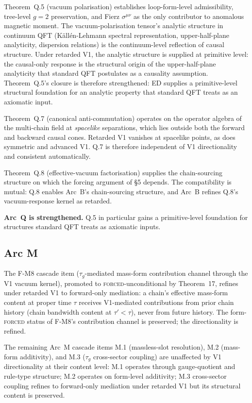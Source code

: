 \documentclass[11pt,a4paper]{article}
\begin{document}
Theorem~Q.5 (vacuum polarisation) establishes loop-form-level admissibility, tree-level $g=2$ preservation, and Fierz $\sigma^{\mu\nu}$ as the only contributor to anomalous magnetic moment. The vacuum-polarisation tensor's analytic structure in continuum QFT (K\"all\'en-Lehmann spectral representation, upper-half-plane analyticity, dispersion relations) is the continuum-level reflection of causal structure. Under retarded V1, the analytic structure is supplied at primitive level: the causal-only response is the structural origin of the upper-half-plane analyticity that standard QFT postulates as a causality assumption. Theorem~Q.5's closure is therefore strengthened: ED supplies a primitive-level structural foundation for an analytic property that standard QFT treats as an axiomatic input.

Theorem~Q.7 (canonical anti-commutation) operates on the operator algebra of the multi-chain field at \emph{spacelike} separations, which lies outside both the forward and backward causal cones. Retarded V1 vanishes at spacelike points, as does symmetric and advanced V1. Q.7 is therefore independent of V1 directionality and consistent automatically.

Theorem~Q.8 (effective-vacuum factorisation) supplies the chain-sourcing structure on which the forcing argument of \S5 depends. The compatibility is mutual: Q.8 enables Arc~B's chain-sourcing structure, and Arc~B refines Q.8's vacuum-response kernel as retarded.

\textbf{Arc~Q is strengthened.} Q.5 in particular gains a primitive-level foundation for structures standard QFT treats as axiomatic inputs.

\subsection{Arc M}

The F-M8 cascade item ($\tau_g$-mediated mass-form contribution channel through the V1 vacuum kernel), promoted to \textsc{forced}-unconditional by Theorem~17, refines under retarded V1 to forward-only mediation: a chain's effective mass-form content at proper time $\tau$ receives V1-mediated contributions from prior chain history (chain bandwidth content at $\tau' < \tau$), never from future history. The form-\textsc{forced} status of F-M8's contribution channel is preserved; the directionality is refined.

The remaining Arc~M cascade items M.1 (massless-slot resolution), M.2 (mass-form additivity), and M.3 ($\tau_g$ cross-sector coupling) are unaffected by V1 directionality at their content level: M.1 operates through gauge-quotient and rule-type structure; M.2 operates on form-level additivity; M.3 cross-sector coupling refines to forward-only mediation under retarded V1 but its structural content is preserved.
\end{document}
